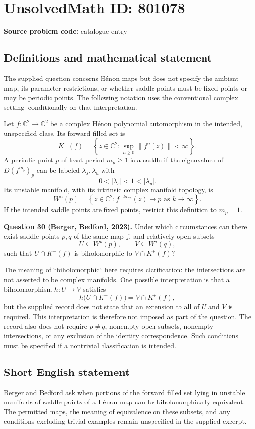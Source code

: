 \documentclass[11pt]{article}
\newcommand{\C}{\mathbb{C}}
\begin{document}
\section*{UnsolvedMath ID: 801078}
\textbf{Source problem code:} catalogue entry
\subsection{Definitions and mathematical statement}
The supplied question concerns Hénon maps but does not specify the ambient map, its parameter restrictions, or whether saddle points must be fixed points or may be periodic points. The following notation uses the conventional complex setting, conditionally on that interpretation.

Let \(f\colon\C^2\to\C^2\) be a complex Hénon polynomial automorphism in the intended, unspecified class. Its forward filled set is
\[
K^+(f)=\left\{z\in\C^2:\sup_{n\geq 0}\|f^n(z)\|<\infty\right\}.
\]
A periodic point \(p\) of least period \(m_p\geq1\) is a saddle if the eigenvalues of \(D(f^{m_p})_p\) can be labeled \(\lambda_s,\lambda_u\) with
\[
0<|\lambda_s|<1<|\lambda_u|.
\]
Its unstable manifold, with its intrinsic complex manifold topology, is
\[
W^u(p)=\left\{z\in\C^2:f^{-km_p}(z)\longrightarrow p\text{ as }k\longrightarrow\infty\right\}.
\]
If the intended saddle points are fixed points, restrict this definition to \(m_p=1\).

\textbf{Question 30 (Berger, Bedford, 2023).} Under which circumstances can there exist saddle points \(p,q\) of the same map \(f\), and relatively open subsets
\[
U\subseteq W^u(p),\qquad V\subseteq W^u(q),
\]
such that \(U\cap K^+(f)\) is biholomorphic to \(V\cap K^+(f)\)?

The meaning of ``biholomorphic'' here requires clarification: the intersections are not asserted to be complex manifolds. One possible interpretation is that a biholomorphism \(h\colon U\to V\) satisfies
\[
h\bigl(U\cap K^+(f)\bigr)=V\cap K^+(f),
\]
but the supplied record does not state that an extension to all of \(U\) and \(V\) is required. This interpretation is therefore not imposed as part of the question. The record also does not require \(p\neq q\), nonempty open subsets, nonempty intersections, or any exclusion of the identity correspondence. Such conditions must be specified if a nontrivial classification is intended.
\subsection{Short English statement}
Berger and Bedford ask when portions of the forward filled set lying in unstable manifolds of saddle points of a Hénon map can be biholomorphically equivalent. The permitted maps, the meaning of equivalence on these subsets, and any conditions excluding trivial examples remain unspecified in the supplied excerpt.
\end{document}
